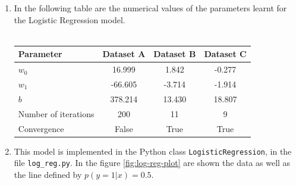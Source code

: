 \documentclass[a4paper, 11pt]{article}
\begin{document}
\begin{enumerate}[label=\alph*]
    \item In the following table are the numerical values of the parameters learnt for the Logistic Regression model. \\
    \\
        \begin{tabular}{ | l || *{3}{c| } }
             \hline
                Parameter & Dataset A & Dataset B & Dataset C \\
             \hline			
               $w_0$ & 16.999 & 1.842 & -0.277 \\
               $w_1$ & -66.605 & -3.714 & -1.914 \\
               $b$ & 378.214 & 13.430 & 18.807 \\
            \hline
               Number of iterations & 200 & 11 & 9 \\
               Convergence & False & True & True \\
             \hline  
         \end{tabular}
    
    \item This model is implemented in the Python class \texttt{LogisticRegression}, in the file \texttt{log\_reg.py}. In the figure \ref{fig:log-reg-plot} are shown the data as well as the line defined by $p \left( y=1 | x \right) = 0.5$.
    

\end{enumerate}
\end{document}

